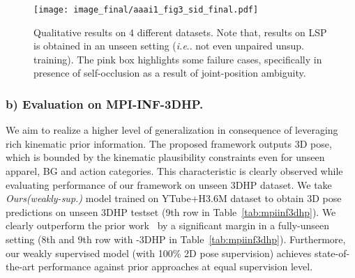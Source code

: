 \documentclass[letterpaper]{article} \usepackage{aaai20}  \usepackage{times}  \usepackage{helvet}  \usepackage{courier}  \usepackage{url}  \usepackage{graphicx}  \usepackage{amsmath}
\makeatletter
\DeclareRobustCommand\onedot{\futurelet\@let@token\@onedot}
\def\@onedot{\ifx\@let@token.\else.\null\fi\xspace}
\def\ie{\emph{i.e}\onedot} \def\Ie{\emph{I.e}\onedot}
\makeatother
\begin{document}
\begin{figure*}[!tbhp]\begin{center}
	\texttt{[image: image\_final/aaai1\_fig3\_sid\_final.pdf]}
	\vspace{-4mm}
	\caption{\small 
	Qualitative results on 4 different datasets. Note that, results on LSP is obtained in an unseen setting (\ie not even unpaired unsup. training). The pink box highlights some failure cases, specifically in presence of self-occlusion as a result of joint-position ambiguity.
	}
    \vspace{-2mm}
    \label{fig:qualitative}  
\end{center}
\end{figure*}


\subsubsection{b) Evaluation on MPI-INF-3DHP.}
We aim to realize a higher level of generalization in consequence of leveraging rich kinematic prior information. The proposed framework outputs 3D pose, which is bounded by the kinematic plausibility constraints even for unseen apparel, BG and action categories. This characteristic is clearly observed while evaluating performance of our framework on unseen 3DHP dataset. We take \textit{Ours(weakly-sup.)} model trained on YTube+H3.6M dataset to obtain 3D pose predictions on unseen 3DHP testset (9th row in Table~\ref{tab:mpiinf3dhp}). We clearly outperform the prior work~\cite{chen2019unsupervised} by a significant margin in a fully-unseen setting (8th and 9th row with -3DHP in Table~\ref{tab:mpiinf3dhp}). Furthermore, our weakly supervised model (with 100\% 2D pose supervision) achieves state-of-the-art performance against prior approaches at equal supervision level.
\end{document}
